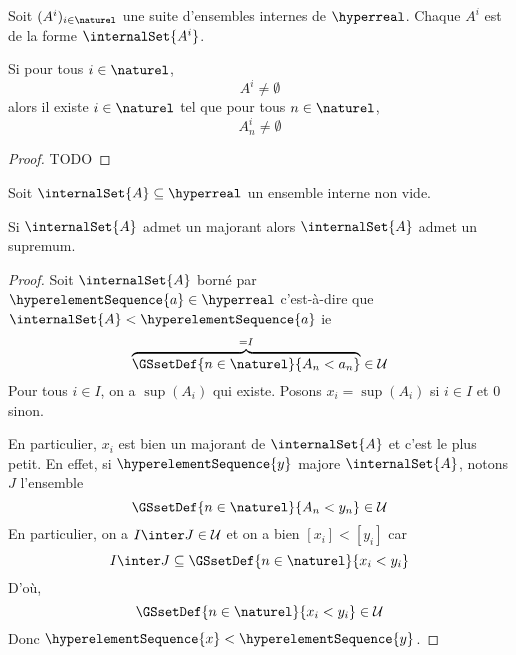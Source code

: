 \begin{proposition}
	Soit $(A^{i})_{i \in \naturel}$ une suite d'ensembles internes de
	$\hyperreal$.
	Chaque $A^{i}$ est de la forme $\internalSet{A^{i}}$.

	Si pour tous $i \in \naturel$,
	\begin{equation}
		A^{i} \neq \emptyset
	\end{equation}
	alors il existe $i \in \naturel$ tel que pour tous $n \in \naturel$,
	\begin{equation}
		A^{i}_{n} \neq \emptyset
	\end{equation}
\end{proposition}

\ifdefined\outputproof
\begin{proof}
	TODO
\end{proof}
\fi

\begin{proposition}
	Soit $\internalSet{A} \subseteq \hyperreal$ un ensemble interne non vide.

	Si $\internalSet{A}$ admet un majorant alors $\internalSet{A}$ admet un supremum.
\end{proposition}

\begin{proof}
	Soit $\internalSet{A}$ borné par $\hyperelementSequence{a} \in \hyperreal$
	c'est-à-dire que $\internalSet{A} < \hyperelementSequence{a}$ ie
	\begin{equation}
		\overbrace{\GSsetDef{n \in \naturel}{A_{n} < a_{n}}}^{= I} \in \mathcal{U}
	\end{equation}
	Pour tous $i \in I$, on a $\sup(A_{i})$ qui existe.
	Posons $x_{i} = \sup(A_{i})$ si $i \in I$ et $0$ sinon.

	En particulier, $x_{i}$ est bien un majorant de $\internalSet{A}$ et c'est
	le plus petit. En effet, si $\hyperelementSequence{y}$ majore $\internalSet{A}$, notons $J$
	l'ensemble
	\begin{equation}
		\GSsetDef{n \in \naturel}{A_{n} < y_{n}} \in \mathcal{U}
	\end{equation}
	En particulier, on a $I \inter J \in \mathcal{U}$ et on a bien $[x_{i}] <
	[y_{i}]$ car
	\begin{equation}
		I \inter J \subseteq \GSsetDef{n \in \naturel}{x_{i} < y_{i}}
	\end{equation}
	D'où,
	\begin{equation}
		\GSsetDef{n \in \naturel}{x_{i} < y_{i}} \in \mathcal{U}
	\end{equation}
	Donc $\hyperelementSequence{x} < \hyperelementSequence{y}$.
\end{proof}

